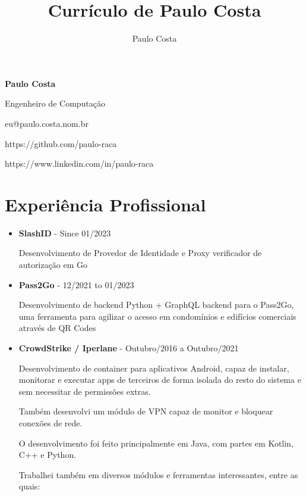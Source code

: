 \documentclass[a4paper,10pt]{article}
\title{Currículo de Paulo Costa}
\author{Paulo Costa}
\begin{document}
  
  \LARGE\textbf{Paulo Costa}

  \large Engenheiro de Computação

  \large eu@paulo.costa.nom.br

  \large https://github.com/paulo-raca

  \large https://www.linkedin.com/in/paulo-raca



  \normalsize 

  \section{Experiência Profissional}
    \begin{itemize}
      \item
        \textbf{SlashID} - Since 01/2023

        Desenvolvimento de Provedor de Identidade e Proxy verificador de autorização em Go

      \item
        \textbf{Pass2Go} - 12/2021 to 01/2023

        Desenvolvimento de backend Python + GraphQL backend para o Pass2Go, uma ferramenta para agilizar o acesso em condomínios e edifícios comerciais através de QR Codes

      \item
        \textbf{CrowdStrike / Iperlane} - Outubro/2016 a Outubro/2021

        Desenvolvimento de container para aplicativos Android, capaz de instalar, monitorar e executar
        apps de terceiros de forma isolada do resto do sistema e sem necessitar de permissões extras.

        Também desenvolvi um módulo de VPN capaz de monitor e bloquear conexões de rede.

        O desenvolvimento foi feito principalmente em Java, com partes em Kotlin, C++ e Python.

        Trabalhei também em diversos módulos e ferramentas interessantes, entre as quais:


\end{itemize}
\end{document}
